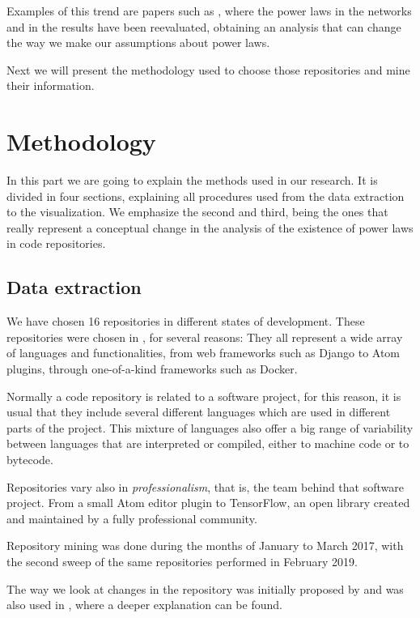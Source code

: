 \documentclass{article}
\begin{document}
Examples of this trend are papers such as \cite{Holme2019,
  Broido2019}, where the power laws in the networks and in the results
have been reevaluated, obtaining an analysis that can change the way
we make our assumptions about power laws.

Next we will present the methodology used to choose those repositories
and mine their information.




\section{Methodology}
\label{sec:method}

In this part we are going to explain the methods used in our
research. It is divided in four sections, explaining all procedures
used from the data extraction to the visualization. We emphasize the
second and third, being the ones that really represent a conceptual
change in the analysis of the existence of power laws in code
repositories.

\subsection{Data extraction}
We have chosen 16 repositories in different states of development.
These repositories were chosen in \cite{Merelo2016:repomining}, for
several reasons: They all represent a wide array of languages and
functionalities, from web frameworks such as Django to Atom plugins,
through one-of-a-kind frameworks such as Docker.

Normally a code repository is related to a software project, for this
reason, it is usual that they include several different languages
which are used in different parts of the project.  This mixture of
languages also offer a big range of variability between languages that
are interpreted or compiled, either to machine code or to bytecode.

Repositories vary also in {\em professionalism}, that is, the team
behind that software project. From a small Atom editor plugin to
TensorFlow, an open library created and maintained by a fully
professional community.

Repository mining was done during the months of January to March 2017,
with the second sweep of the same repositories performed in February
2019.

The way we look at changes in the repository was initially proposed by
\cite{Merelo2016:repomining} and was also used in
\cite{merelo2017self}, where a deeper explanation can be found.
\end{document}
